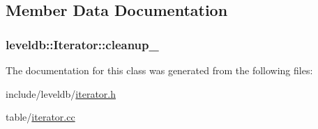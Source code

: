 \subsection{Member Data Documentation}
\hypertarget{classleveldb_1_1_iterator_aa65451661a270eab5db682d4e4a01773}{
\subsubsection[{cleanup\-\_\-}]{ leveldb\-::\-Iterator\-::cleanup\-\_\-\hspace{0.3cm}{\ttfamily [private]}}}\label{classleveldb_1_1_iterator_aa65451661a270eab5db682d4e4a01773}


The documentation for this class was generated from the following files\-:\begin{DoxyCompactItemize}
\item 
include/leveldb/\hyperlink{iterator_8h}{iterator.\-h}\item 
table/\hyperlink{iterator_8cc}{iterator.\-cc}\end{DoxyCompactItemize}
